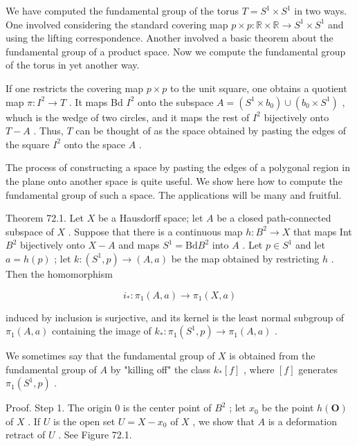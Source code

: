 \documentclass[10pt]{article}
\begin{document}
We have computed the fundamental group of the torus \(T = {S}^{1} \times  {S}^{1}\) in two ways. One involved considering the standard covering map \(p \times  p : \mathbb{R} \times  \mathbb{R} \rightarrow  {S}^{1} \times  {S}^{1}\) and using the lifting correspondence. Another involved a basic theorem about the fundamental group of a product space. Now we compute the fundamental group of the torus in yet another way.

If one restricts the covering map \(p \times  p\) to the unit square, one obtains a quotient map \(\pi  : {I}^{2} \rightarrow  T\) . It maps Bd \({I}^{2}\) onto the subspace \(A = \left( {{S}^{1} \times  {b}_{0}}\right)  \cup  \left( {{b}_{0} \times  {S}^{1}}\right)\) , whuch is the wedge of two circles, and it maps the rest of \({I}^{2}\) bijectively onto \(T - A\) . Thus, \(T\) can be thought of as the space obtained by pasting the edges of the square \({I}^{2}\) onto the space \(A\) .

The process of constructing a space by pasting the edges of a polygonal region in the plane onto another space is quite useful. We show here how to compute the fundamental group of such a space. The applications will be many and fruitful.

Theorem 72.1. Let \(X\) be a Hausdorff space; let \(A\) be a closed path-connected subspace of \(X\) . Suppose that there is a continuous map \(h : {B}^{2} \rightarrow  X\) that maps Int \({B}^{2}\) bijectively onto \(X - A\) and maps \({S}^{1} = \mathrm{{Bd}}{B}^{2}\) into \(A\) . Let \(p \in  {S}^{1}\) and let \(a = h\left( p\right)\) ; let \(k : \left( {{S}^{1},p}\right)  \rightarrow  \left( {A,a}\right)\) be the map obtained by restricting \(h\) . Then the homomorphism

\[
{i}_{ * } : {\pi }_{1}\left( {A,a}\right)  \rightarrow  {\pi }_{1}\left( {X,a}\right)
\]

induced by inclusion is surjective, and its kernel is the least normal subgroup of \({\pi }_{1}\left( {A,a}\right)\) containing the image of \({k}_{ * } : {\pi }_{1}\left( {{S}^{1},p}\right)  \rightarrow  {\pi }_{1}\left( {A,a}\right)\) .

We sometimes say that the fundamental group of \(X\) is obtained from the fundamental group of \(A\) by "killing off" the class \({k}_{ * }\left\lbrack  f\right\rbrack\) , where \(\left\lbrack  f\right\rbrack\) generates \({\pi }_{1}\left( {{S}^{1},p}\right)\) .

Proof. Step 1. The origin 0 is the center point of \({B}^{2}\) ; let \({x}_{0}\) be the point \(h\left( \mathbf{O}\right)\) of \(X\) . If \(U\) is the open set \(U = X - {x}_{0}\) of \(X\) , we show that \(A\) is a deformation retract of \(U\) . See Figure 72.1.
\end{document}
